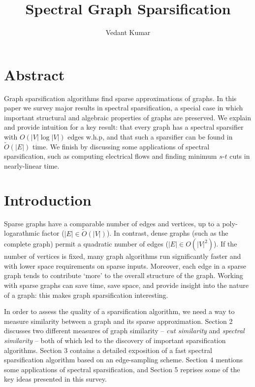 \documentclass{article}
\title{Spectral Graph Sparsification}
\author{Vedant Kumar}
\begin{document}
\maketitle

\newcommand \cut[1]{\text{cut}_{#1}}
\newcommand \textlcsc[1]{\textsc{\MakeLowercase{#1}}}

\section*{Abstract}

Graph sparsification algorithms find sparse approximations of graphs. In
this paper we survey major results in spectral sparsification, a special
case in which important structural and algebraic properties of graphs are
preserved. We explain and provide intuition for a key result: that every
graph has a spectral sparsifier with $O(|V|\log|V|)$ edges w.h.p, and that
such a sparsifier can be found in $\tilde{O}(|E|)$ time. We finish by
discussing some applications of spectral sparsification, such as computing
electrical flows and finding minimum $s$-$t$ cuts in nearly-linear time.

\section{Introduction}

Sparse graphs have a comparable number of edges and vertices, up to a
poly-logarathmic factor ($|E| \in \tilde{O}(|V|)$). In contrast, dense
graphs (such as the complete graph) permit a quadratic number of edges ($|E|
\in O(|V|^2)$). If the number of vertices is fixed, many graph algorithms
run significantly faster and with lower space requirements on sparse inputs.
Moreover, each edge in a sparse graph tends to contribute `more' to the
overall structure of the graph.  Working with sparse graphs can save time,
save space, and provide insight into the nature of a graph: this makes graph
sparsification interesting.

In order to assess the quality of a sparsification algorithm, we need a way
to measure similarity between a graph and its sparse approximation. Section
2 discusses two different measures of graph similarity --
\textit{cut similarity} and \textit{spectral similarity} -- both of which
led to the discovery of important sparsification algorithms. Section 3
contains a detailed exposition of a fast spectral sparsification algorithm
based on an edge-sampling scheme.  Section 4 mentions some applications of
spectral sparsification, and Section 5 reprises some of the key ideas
presented in this survey.
\end{document}
